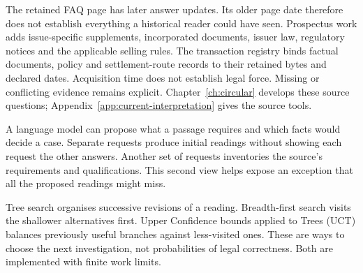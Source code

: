 \documentclass[12pt,a4paper,oneside,openany]{book}
\begin{document}
The retained FAQ page has later answer updates. Its older page date therefore
does not establish everything a historical reader could have seen. Prospectus
work adds issue-specific supplements, incorporated documents, issuer law,
regulatory notices and the applicable selling rules. The transaction registry
binds factual documents, policy and settlement-route records to their retained
bytes and declared dates. Acquisition time does not establish legal force.
Missing or conflicting evidence remains explicit. Chapter~\ref{ch:circular}
develops these source questions; Appendix~\ref{app:current-interpretation} gives
the source tools.

\clearpage
{}
A language model can propose what a passage requires and which facts would
decide a case. Separate requests produce initial readings without showing each
request the other answers. Another set of requests inventories the source's
requirements and qualifications. This second view helps expose an exception
that all the proposed readings might miss.

\begin{MapDiagram}
\end{MapDiagram}

Tree search organises successive revisions of a reading. Breadth-first search
visits the shallower alternatives first. Upper Confidence bounds applied to
Trees (UCT) balances previously useful branches against less-visited ones.
These are ways to choose the next investigation, not probabilities of legal
correctness. Both are implemented with finite work limits.
\end{document}
